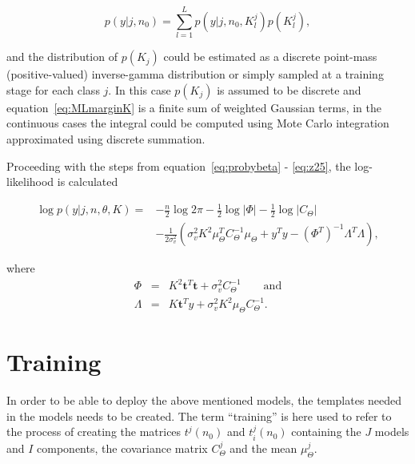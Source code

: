\begin{equation}\label{eq:MLmarginK}
p(y|j,n_0)=\sum_{l=1}^L p(y|j, n_0, K^j_l) p(K^j_l),
\end{equation}


and the distribution of $p(K_j)$ could be estimated as a discrete point-mass \linebreak[0](positive-valued) inverse-gamma distribution or simply sampled at a training stage for each class $j$. In this case $p(K_j)$ is assumed to be discrete and equation~\ref{eq:MLmarginK} is a finite sum of weighted Gaussian terms, in the continuous cases the integral could be computed using Mote Carlo integration approximated using discrete summation.

Proceeding with the steps from equation~\ref{eq:probybeta} - \ref{eq:z25}, the log-likelihood is calculated

\begin{equation}\label{eq:loglikeliK}\begin{split}
\log{p(y|j,n,\theta,K)} = &- \frac{n}{2}\log{2 \pi}- \frac{1}{2}\log{|\Phi|} - \frac{1}{2}\log{|C_\Theta|} \\
& -\frac{1}{2\sigma^2_v}\left(\sigma_v^2K^2\mu_\Theta^TC_\Theta^{-1}\mu_\Theta + y^Ty- \left(\Phi^T\right)^{-1}\Lambda^T\Lambda\right),
\end{split}\end{equation}

where
\begin{eqnarray}
\label{eq:z3K}
\Phi &=& K^2 \textbf{t}^T\textbf{t} + \sigma_v^2C_\Theta^{-1} \qquad \textrm{and}\\\nonumber
\Lambda &=& K \textbf{t}^Ty + \sigma_v^2K^2\mu_\Theta C_\Theta^{-1}.
\end{eqnarray}

\section{Training}\label{sec:APRtraining}
In order to be able to deploy the above mentioned models, the templates needed in the models needs to be created. The term ``training'' is here used to refer to the process of creating the matrices $t^j(n_0)$ and $t^j_i(n_0)$ containing the $J$ models and $I$ components, the covariance matrix $C^j_\Theta$ and the mean $\mu^j_\Theta$.

